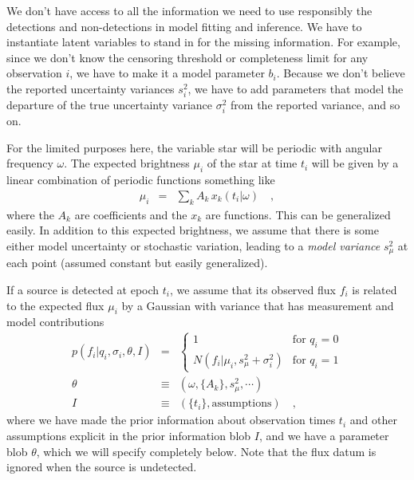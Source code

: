 \documentclass[12pt]{article}
\begin{document}
We don't have access to all the information we need to use responsibly
the detections and non-detections in model fitting and inference.  We
have to instantiate latent variables to stand in for the missing
information.  For example, since we don't know the censoring threshold
or completeness limit for any observation $i$, we have to make it a
model parameter $b_i$.  Because we don't believe the reported
uncertainty variances $s_i^2$, we have to add parameters that model
the departure of the true uncertainty variance $\sigma_i^2$ from the
reported variance, and so on.

For the limited purposes here, the variable star will be periodic with
angular frequency $\omega$.  The expected brightness $\mu_i$ of the
star at time $t_i$ will be given by a linear combination of periodic
functions something like
\begin{eqnarray}\displaystyle
\mu_i &=& \sum_k A_k\,x_k(t_i|\omega)
\quad ,
\end{eqnarray}
where the $A_k$ are coefficients and the $x_k$ are functions.  This
can be generalized easily.  In addition to this expected brightness,
we assume that there is some either model uncertainty or stochastic
variation, leading to a \emph{model variance} $s_\mu^2$ at each point
(assumed constant but easily generalized).

If a source is detected at epoch $t_i$, we assume that its observed
flux $f_i$ is related to the expected flux $\mu_i$ by a Gaussian with
variance that has measurement and model contributions
\begin{eqnarray}\displaystyle
p(f_i|q_i,\sigma_i,\theta,I) &=& \left\{\begin{array}{ll}
  1 & \mbox{for $q_i=0$} \\
  N(f_i|\mu_i,s_\mu^2+\sigma_i^2) & \mbox{for $q_i=1$}
\end{array}\right.\label{eq:poff}
\\
\theta &\equiv& (\omega, \{A_k\}, s_\mu^2, \cdots)
\\
I &\equiv& (\{t_i\}, \mbox{assumptions})
\quad ,
\end{eqnarray}
where we have made the prior information about observation times $t_i$
and other assumptions explicit in the prior information blob $I$, and
we have a parameter blob $\theta$, which we will specify completely
below.  Note that the flux datum is ignored when the source is
undetected.
\end{document}
